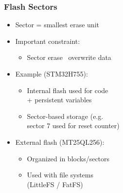   \begin{minipage}[t]{0.38\linewidth}
  \subsubsection{Flash Sectors}
    \begin{itemize}
      \item Sector = smallest erase unit
      \item Important constraint:
        \begin{itemize}
          \item Sector erase \textrightarrow~overwrite data
        \end{itemize}
      \item Example (STM32H755):
        \begin{itemize}
          \item Internal flash used for code\\+ persistent variables
          \item Sector-based storage (e.g.\\sector 7 used for reset counter)
        \end{itemize}
      \item External flash (MT25QL256):
        \begin{itemize}
          \item Organized in blocks/sectors
          \item Used with file systems\\(LittleFS / FatFS)
        \end{itemize}
    \end{itemize}
  \end{minipage}\hfill
